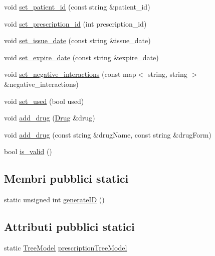 \begin{DoxyCompactItemize}
\item 
void \mbox{\hyperlink{classmm_1_1model_1_1_prescription_a7854a3ef7a7fa8e15bc7a5570e1d0946}{set\+\_\+patient\+\_\+id}} (const string \&patient\+\_\+id)
\item 
void \mbox{\hyperlink{classmm_1_1model_1_1_prescription_a2514cc052803d493974172dad8659806}{set\+\_\+prescription\+\_\+id}} (int prescription\+\_\+id)
\item 
void \mbox{\hyperlink{classmm_1_1model_1_1_prescription_a0d4cc625d7a39ea9f00bc8885380b391}{set\+\_\+issue\+\_\+date}} (const string \&issue\+\_\+date)
\item 
void \mbox{\hyperlink{classmm_1_1model_1_1_prescription_a3cb9e467c00323e94e4347e308dc67ba}{set\+\_\+expire\+\_\+date}} (const string \&expire\+\_\+date)
\item 
void \mbox{\hyperlink{classmm_1_1model_1_1_prescription_a90ab6821dda442d202d8dabf50c52cc3}{set\+\_\+negative\+\_\+interactions}} (const map$<$ string, string $>$ \&negative\+\_\+interactions)
\item 
void \mbox{\hyperlink{classmm_1_1model_1_1_prescription_a25c7a50956777551b938990157d0046a}{set\+\_\+used}} (bool used)
\item 
void \mbox{\hyperlink{classmm_1_1model_1_1_prescription_aa34227766a8ab89f1f47f8ac72de562d}{add\+\_\+drug}} (\mbox{\hyperlink{classmm_1_1model_1_1_drug}{Drug}} \&drug)
\item 
void \mbox{\hyperlink{classmm_1_1model_1_1_prescription_a3838d3a11a4c86a8fef81750db4fb516}{add\+\_\+drug}} (const string \&drug\+Name, const string \&drug\+Form)
\item 
bool \mbox{\hyperlink{classmm_1_1model_1_1_prescription_aa63e30d0439cd7c06f155641e1b8390d}{is\+\_\+valid}} ()
\end{DoxyCompactItemize}
\subsection*{Membri pubblici statici}
\begin{DoxyCompactItemize}
\item 
static unsigned int \mbox{\hyperlink{classmm_1_1model_1_1_prescription_a56439663fa7d275978b7e38c83960476}{generate\+ID}} ()
\end{DoxyCompactItemize}
\subsection*{Attributi pubblici statici}
\begin{DoxyCompactItemize}
\item 
static \mbox{\hyperlink{structmm_1_1model_1_1_prescription_1_1_tree_model}{Tree\+Model}} \mbox{\hyperlink{classmm_1_1model_1_1_prescription_a5dd928aaafb51cd30d4183df7697ce49}{prescription\+Tree\+Model}}
\end{DoxyCompactItemize}


